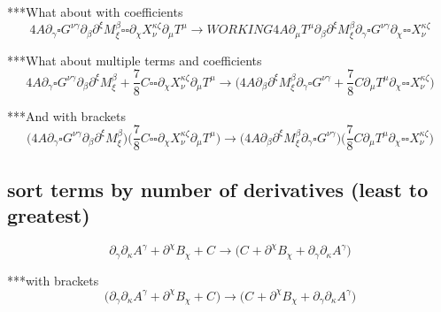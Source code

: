 \documentclass{article}
\def\){\Big)}
\def\({\Big(}
\begin{document}
{***What about with coefficients
\begin{equation}
4A\partial_{\gamma} \square G^{\nu \gamma} \partial_{\beta}\partial^{\xi} M^{\beta}_{\xi}   \square \square \partial_{\chi} X^{\kappa \zeta}_{\nu}  \partial_{\mu}T^{\mu} \rightarrow WORKING
4 A \partial_{\mu}T^{\mu} \partial_{\beta}\partial^{\xi}M_{\xi}^{\beta} \partial_{\gamma}\square G^{\nu \gamma} \partial_{\chi}\square \square X_{\nu}^{\kappa \zeta}
\end{equation}

***What about multiple terms and coefficients
\begin{equation}
4A\partial_{\gamma} \square G^{\nu \gamma} \partial_{\beta}\partial^{\xi} M^{\beta}_{\xi} +
  \frac{7}{8} C \square \square \partial_{\chi} X^{\kappa \zeta}_{\nu}  \partial_{\mu}T^{\mu} \rightarrow 
\(4 A \partial_{\beta}\partial^{\xi}M_{\xi}^{\beta} \partial_{\gamma}\square G^{\nu \gamma} +\frac{7}{8} C \partial_{\mu}T^{\mu} \partial_{\chi}\square \square X_{\nu}^{\kappa \zeta} \)
\end{equation}

***And with brackets 
\begin{equation}
\( 4A\partial_{\gamma} \square G^{\nu \gamma} \partial_{\beta}\partial^{\xi} M^{\beta}_{\xi}\)\(
  \frac{7}{8} C \square \square \partial_{\chi} X^{\kappa \zeta}_{\nu}  \partial_{\mu}T^{\mu} \) \rightarrow 
\(4 A \partial_{\beta}\partial^{\xi}M_{\xi}^{\beta} \partial_{\gamma}\square G^{\nu \gamma} \)\(\frac{7}{8} C \partial_{\mu}T^{\mu} \partial_{\chi}\square \square X_{\nu}^{\kappa \zeta} \)
 \end{equation}


 \subsection{sort terms by number of derivatives (least to greatest)}

\begin{equation}
\partial_{\gamma} \partial_{\kappa}A^{\gamma} + \partial^{\chi}B_{\chi} + C^{} \rightarrow 
\( C^{} + \partial^{\chi}B_{\chi} + \partial_{\gamma}\partial_{\kappa}A^{\gamma} \)
\end{equation}

***with brackets
\begin{equation}
\(\partial_{\gamma} \partial_{\kappa}A^{\gamma} + \partial^{\chi}B_{\chi} + C^{}\)  \rightarrow 
\( C^{} + \partial^{\chi}B_{\chi} + \partial_{\gamma}\partial_{\kappa}A^{\gamma} \)
\end{equation}

}
\end{document}
